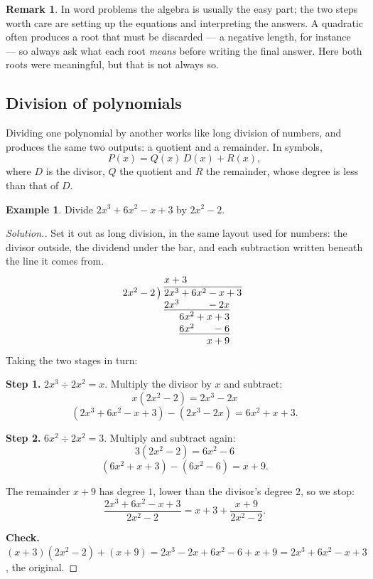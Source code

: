 \documentclass[11pt,a4paper]{article}
\theoremstyle{definition}
\newtheorem{example}[thm]{Example}
\newtheorem{remark}[thm]{Remark}
\newenvironment{solution}
  {\renewcommand{\qedsymbol}{}\begin{proof}[\textit{Solution}.]}
  {\end{proof}}
\begin{document}
\begin{remark}
In word problems the algebra is usually the easy part; the two steps worth care are
setting up the equations and interpreting the answers. A quadratic often produces a
root that must be discarded --- a negative length, for instance --- so always ask what
each root \emph{means} before writing the final answer. Here both roots were
meaningful, but that is not always so.
\end{remark}

\subsection{Division of polynomials}

Dividing one polynomial by another works like long division of numbers, and produces
the same two outputs: a quotient and a remainder. In symbols,
$$P(x)=Q(x)\,D(x)+R(x),$$
where $D$ is the divisor, $Q$ the quotient and $R$ the remainder, whose degree is less
than that of $D$.

\begin{example}
Divide $2x^3+6x^2-x+3$ by $2x^2-2$.
\end{example}

\begin{solution}
Set it out as long division, in the same layout used for numbers: the divisor
outside, the dividend under the bar, and each subtraction written beneath the
line it comes from.
$$\begin{array}{r@{\;}l}
 & x+3\\
2x^{2}-2\,\big) & \overline{2x^{3}+6x^{2}-x+3}\\
 & \underline{2x^{3}\phantom{{}+6x^{2}}-2x}\phantom{{}+3}\\
 & \phantom{2x^{3}}6x^{2}+x+3\\
 & \phantom{2x^{3}}\underline{6x^{2}\phantom{{}+x}-6}\\
 & \phantom{2x^{3}+6x^{2}}x+9
\end{array}$$
Taking the two stages in turn:

\textbf{Step 1.} $2x^3\div 2x^2=x$. Multiply the divisor by $x$ and subtract:
$$x\left(2x^2-2\right)=2x^3-2x$$
$$\left(2x^3+6x^2-x+3\right)-\left(2x^3-2x\right)=6x^2+x+3.$$

\textbf{Step 2.} $6x^2\div 2x^2=3$. Multiply and subtract again:
$$3\left(2x^2-2\right)=6x^2-6$$
$$\left(6x^2+x+3\right)-\left(6x^2-6\right)=x+9.$$

The remainder $x+9$ has degree $1$, lower than the divisor's degree $2$, so we stop:
$$\frac{2x^3+6x^2-x+3}{2x^2-2}=x+3+\frac{x+9}{2x^2-2}.$$

\textbf{Check.} $(x+3)(2x^2-2)+(x+9)=2x^3-2x+6x^2-6+x+9=2x^3+6x^2-x+3$, the original.
\end{solution}
\end{document}
